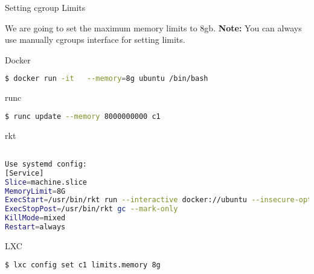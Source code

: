 \begin{frame}[fragile]{Setting cgroup Limits}

We are going to set the maximum memory limits to 8gb. \textbf{Note:} You can always use manually cgroups interface for setting limits.

\begin{block}{Docker}
\begin{lstlisting}[language=bash,keywordstyle=\bf,stringstyle=\it,basicstyle=\tiny]
$ docker run -it   --memory=8g ubuntu /bin/bash
\end{lstlisting}
\end{block}

\begin{block}{runc}
\begin{lstlisting}[language=bash,keywordstyle=\bf,stringstyle=\it,basicstyle=\tiny]
$ runc update --memory 8000000000 c1
\end{lstlisting}
\end{block}



\begin{block}{rkt}
\begin{lstlisting}[language=bash,keywordstyle=\bf,stringstyle=\it,basicstyle=\tiny]

Use systemd config:
[Service]
Slice=machine.slice
MemoryLimit=8G
ExecStart=/usr/bin/rkt run --interactive docker://ubuntu --insecure-options=image --volume data,kind=host,source=/data --mount volume=data,target=/data2
ExecStopPost=/usr/bin/rkt gc --mark-only
KillMode=mixed
Restart=always
\end{lstlisting}
\end{block}

\begin{block}{LXC}
\begin{lstlisting}[language=bash,keywordstyle=\bf,stringstyle=\it,basicstyle=\tiny]
$ lxc config set c1 limits.memory 8g
\end{lstlisting}
\end{block}

\end{frame}


